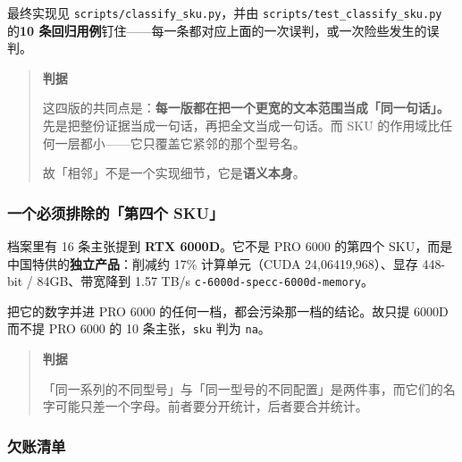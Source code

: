 最终实现见 \texttt{scripts/classify\_sku.py}，并由 \texttt{scripts/test\_classify\_sku.py} 的\textbf{10 条回归用例}钉住——每一条都对应上面的一次误判，或一次险些发生的误判。


\begin{quote}\small
\textbf{ 判据}

这四版的共同点是：\textbf{每一版都在把一个更宽的文本范围当成「同一句话」。}先是把整份证据当成一句话，再把全文当成一句话。而 SKU 的作用域比任何一层都小——它只覆盖它紧邻的那个型号名。

故「相邻」不是一个实现细节，它是\textbf{语义本身}。

\end{quote}

\subsubsection{一个必须排除的「第四个 SKU」}

档案里有 16 条主张提到 \textbf{RTX 6000D}。它不是 PRO 6000 的第四个 SKU，而是中国特供的\textbf{独立产品}：削减约 17\% 计算单元（CUDA 24,06419,968）、显存 448-bit / 84GB、带宽降到 1.57 TB/s {\scriptsize\texttt{c-\hspace{0pt}6000d-\hspace{0pt}spec}}{\scriptsize\texttt{c-\hspace{0pt}6000d-\hspace{0pt}memory}}。


把它的数字并进 PRO 6000 的任何一档，都会污染那一档的结论。故只提 6000D 而不提 PRO 6000 的 10 条主张，\texttt{sku} 判为 \texttt{na}。


\begin{quote}\small
\textbf{ 判据}

「同一系列的不同型号」与「同一型号的不同配置」是两件事，而它们的名字可能只差一个字母。前者要分开统计，后者要合并统计。

\end{quote}

\subsubsection{欠账清单}

